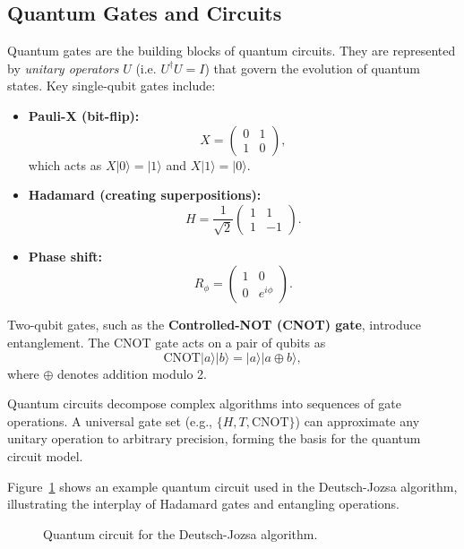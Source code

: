 
\subsection{Quantum Gates and Circuits}
\label{subsec:gates}

Quantum gates are the building blocks of quantum circuits. They are represented by \emph{unitary operators} \(U\) (i.e. \(U^\dagger U = I\)) that govern the evolution of quantum states. Key single-qubit gates include:
\begin{itemize}
    \item \textbf{Pauli-X (bit-flip):} 
    \[
    X = \begin{pmatrix} 0 & 1 \\ 1 & 0 \end{pmatrix},
    \]
    which acts as \(X|0\rangle = |1\rangle\) and \(X|1\rangle = |0\rangle\).
    \item \textbf{Hadamard (creating superpositions):}
    \[
    H = \frac{1}{\sqrt{2}}\begin{pmatrix} 1 & 1 \\ 1 & -1 \end{pmatrix}.
    \]
    \item \textbf{Phase shift:}
    \[
    R_\phi = \begin{pmatrix} 1 & 0 \\ 0 & e^{i\phi} \end{pmatrix}.
    \]
\end{itemize}

Two-qubit gates, such as the \textbf{Controlled-NOT (CNOT) gate}, introduce entanglement. The CNOT gate acts on a pair of qubits as
\[
\text{CNOT}|a\rangle|b\rangle = |a\rangle|a \oplus b\rangle,
\]
where \(\oplus\) denotes addition modulo 2.

Quantum circuits decompose complex algorithms into sequences of gate operations. A universal gate set (e.g., \(\{H, T, \text{CNOT}\}\)) can approximate any unitary operation to arbitrary precision, forming the basis for the quantum circuit model.

Figure~\ref{fig:deutsch_circuit} shows an example quantum circuit used in the Deutsch-Jozsa algorithm, illustrating the interplay of Hadamard gates and entangling operations.

\begin{figure}[h]
\centering
{}
\caption{Quantum circuit for the Deutsch-Jozsa algorithm.}
\label{fig:deutsch_circuit}
\end{figure}
